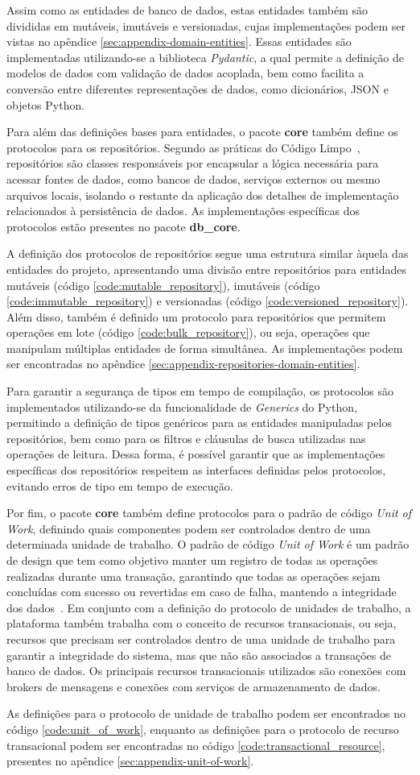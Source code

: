 Assim como as entidades de banco de dados, estas entidades também são divididas em mutáveis, imutáveis e versionadas, cujas implementações podem ser vistas no apêndice \ref{sec:appendix-domain-entities}. Essas entidades são implementadas utilizando-se a biblioteca \textit{Pydantic}, a qual permite a definição de modelos de dados com validação de dados acoplada, bem como facilita a conversão entre diferentes representações de dados, como dicionários, JSON e objetos Python.

Para além das definições bases para entidades, o pacote \textbf{core} também define os protocolos para os repositórios. Segundo as práticas do Código Limpo~\cite{martin2008clean}, repositórios são classes responsáveis por encapsular a lógica necessária para acessar fontes de dados, como bancos de dados, serviços externos ou mesmo arquivos locais, isolando o restante da aplicação dos detalhes de implementação relacionados à persistência de dados. As implementações específicas dos protocolos estão presentes no pacote \textbf{db\_core}.

A definição dos protocolos de repositórios segue uma estrutura similar àquela das entidades do projeto, apresentando uma divisão entre repositórios para entidades mutáveis (código \ref{code:mutable_repository}), imutáveis (código \ref{code:immutable_repository}) e versionadas (código \ref{code:versioned_repository}). Além disso, também é definido um protocolo para repositórios que permitem operações em lote (código \ref{code:bulk_repository}), ou seja, operações que manipulam múltiplas entidades de forma simultânea. As implementações podem ser encontradas no apêndice \ref{sec:appendix-repositories-domain-entities}.

Para garantir a segurança de tipos em tempo de compilação, os protocolos são implementados utilizando-se da funcionalidade de \textit{Generics} do Python, permitindo a definição de tipos genéricos para as entidades manipuladas pelos repositórios, bem como para os filtros e cláusulas de busca utilizadas nas operações de leitura. Dessa forma, é possível garantir que as implementações específicas dos repositórios respeitem as interfaces definidas pelos protocolos, evitando erros de tipo em tempo de execução.

Por fim, o pacote \textbf{core} também define protocolos para o padrão de código \textit{Unit of Work}, definindo quais componentes podem ser controlados dentro de uma determinada unidade de trabalho. O padrão de código \textit{Unit of Work} é um padrão de design que tem como objetivo manter um registro de todas as operações realizadas durante uma transação, garantindo que todas as operações sejam concluídas com sucesso ou revertidas em caso de falha, mantendo a integridade dos dados~\cite{martin2008clean}. Em conjunto com a definição do protocolo de unidades de trabalho, a plataforma também trabalha com o conceito de recursos transacionais, ou seja, recursos que precisam ser controlados dentro de uma unidade de trabalho para garantir a integridade do sistema, mas que não são associados a transações de banco de dados. Os principais recursos transacionais utilizados são conexões com brokers de mensagens e conexões com serviços de armazenamento de dados.

As definições para o protocolo de unidade de trabalho podem ser encontrados no código \ref{code:unit_of_work}, enquanto as definições para o protocolo de recurso transacional podem ser encontradas no código \ref{code:transactional_resource}, presentes no apêndice \ref{sec:appendix-unit-of-work}.
